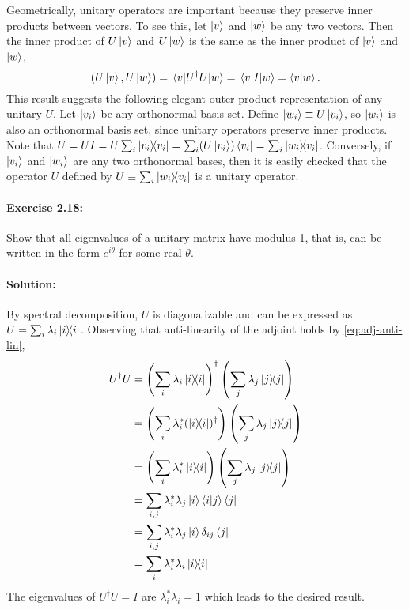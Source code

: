 \documentclass{article}
\begin{document}
Geometrically, unitary operators are important because they preserve inner products between vectors. To see this, let $\ket{v}$ and $\ket{w}$ be any two vectors. Then the inner product of $U\ket{v}$ and $U\ket{w}$ is the same as the inner product of $\ket{v}$ and $\ket{w}$, \begin{equation*}
  (U\ket{v}, U\ket{w}) = \mel{v}{U^\dagger U}{w} = \mel{v}{I}{w} = \braket{v}{w}.
\end{equation*}
This result suggests the following elegant outer product representation of any unitary $U$. Let $\ket{v_i}$ be any orthonormal basis set. Define $\ket{w_i} \equiv U\ket{v_i}$, so $\ket{w_i}$ is also an orthonormal basis set, since unitary operators preserve inner products. Note that $U = UI = U\sum_i \ketbra{v_i}{v_i} = \sum_i (U\ket{v_i})\bra{v_i} = \sum_i \ketbra{w_i}{v_i}$. Conversely, if $\ket{v_i}$ and $\ket{w_i}$ are any two orthonormal bases, then it is easily checked that the operator $U$ defined by $U \equiv \sum_i \ketbra{w_i}{v_i}$ is a unitary operator.

\paragraph{\cite{mikeandike} Exercise 2.18:} Show that all eigenvalues of a unitary matrix have modulus 1, that is, can be written in the form $e^{i\theta}$ for some real $\theta$.

\paragraph{Solution:} By spectral decomposition, $U$ is diagonalizable and can be expressed as $U = \sum_i \lambda_i \ketbra{i}{i}$. Observing that anti-linearity of the adjoint holds by \eqref{eq:adj-anti-lin}, \begin{align*}
  U^\dagger U &= \left(\sum_i \lambda_i \ketbra{i}{i}\right)^\dagger \left(\sum_j \lambda_j \ketbra{j}{j}\right) \\
    &= \left(\sum_i \lambda_i^* (\ketbra{i}{i})^\dagger\right) \left(\sum_j \lambda_j \ketbra{j}{j}\right) \\
    &= \left(\sum_i \lambda_i^*\ketbra{i}{i}\right) \left(\sum_j \lambda_j\ketbra{j}{j}\right) \\
    &= \sum_{i,j} \lambda_i^*\lambda_j\ket{i}\braket{i}{j}\bra{j} \\
    &= \sum_{i,j} \lambda_i^*\lambda_j\ket{i}\delta_{ij}\bra{j} \\
    &= \sum_i \lambda_i^*\lambda_i\ketbra{i}{i}
\end{align*}
The eigenvalues of $U^\dagger U = I$ are $\lambda_i^*\lambda_i = 1$ which leads to the desired result.
\end{document}
